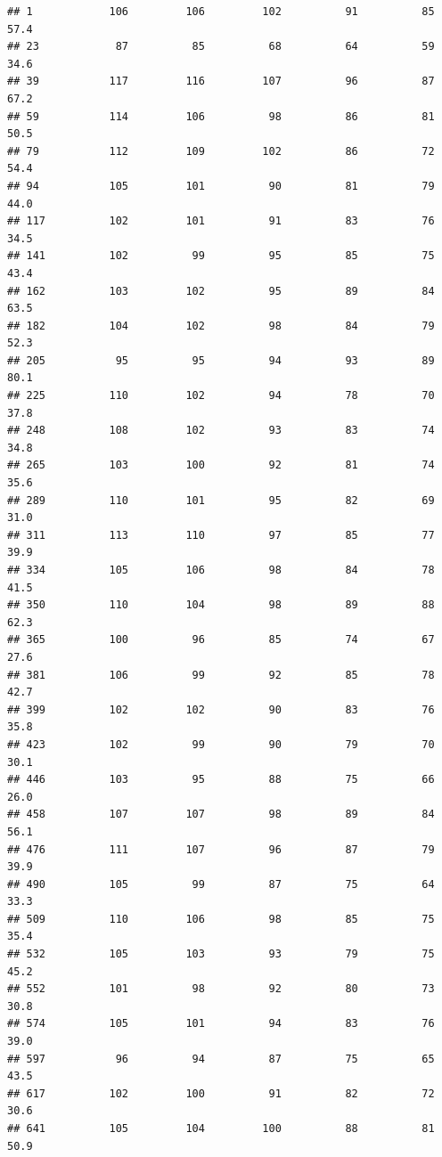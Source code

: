 \documentclass[
]{article}
\begin{document}
\begin{verbatim}
## 1            106         106         102          91          85        57.4
## 23            87          85          68          64          59        34.6
## 39           117         116         107          96          87        67.2
## 59           114         106          98          86          81        50.5
## 79           112         109         102          86          72        54.4
## 94           105         101          90          81          79        44.0
## 117          102         101          91          83          76        34.5
## 141          102          99          95          85          75        43.4
## 162          103         102          95          89          84        63.5
## 182          104         102          98          84          79        52.3
## 205           95          95          94          93          89        80.1
## 225          110         102          94          78          70        37.8
## 248          108         102          93          83          74        34.8
## 265          103         100          92          81          74        35.6
## 289          110         101          95          82          69        31.0
## 311          113         110          97          85          77        39.9
## 334          105         106          98          84          78        41.5
## 350          110         104          98          89          88        62.3
## 365          100          96          85          74          67        27.6
## 381          106          99          92          85          78        42.7
## 399          102         102          90          83          76        35.8
## 423          102          99          90          79          70        30.1
## 446          103          95          88          75          66        26.0
## 458          107         107          98          89          84        56.1
## 476          111         107          96          87          79        39.9
## 490          105          99          87          75          64        33.3
## 509          110         106          98          85          75        35.4
## 532          105         103          93          79          75        45.2
## 552          101          98          92          80          73        30.8
## 574          105         101          94          83          76        39.0
## 597           96          94          87          75          65        43.5
## 617          102         100          91          82          72        30.6
## 641          105         104         100          88          81        50.9

\end{verbatim}
\end{document}
